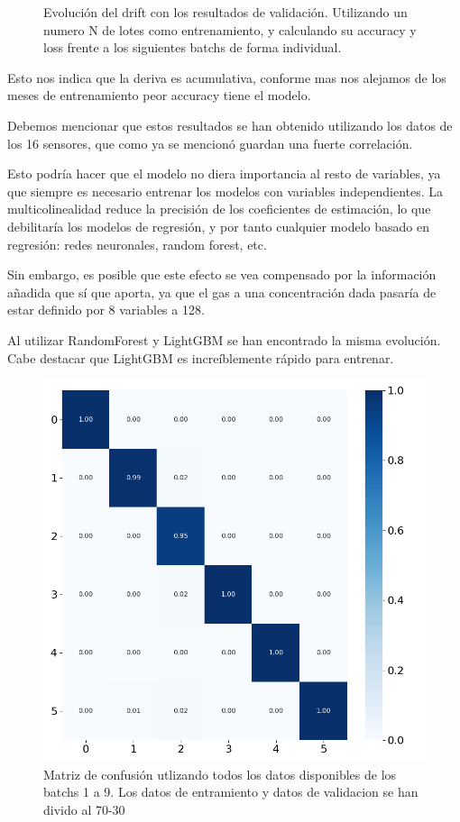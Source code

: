 \begin{figure}
	\caption[Evolución del drift con los resultados de validación]{Evolución del drift con los resultados de validación. Utilizando un numero N de lotes como entrenamiento, y calculando su accuracy y loss frente a los siguientes batchs de forma individual. }
	\label{fig:EvoModelSimpleBatch}
\end{figure}


Esto nos indica que la deriva es acumulativa, conforme mas nos alejamos de los meses de entrenamiento peor accuracy tiene el modelo.


Debemos mencionar que estos resultados se han obtenido utilizando los datos de los 16 sensores, que como ya se mencionó guardan una fuerte correlación. 


Esto podría hacer que el modelo no diera importancia al resto de variables, ya que siempre es necesario entrenar los modelos con variables independientes. La multicolinealidad reduce la precisión de los coeficientes de estimación, lo que debilitaría los modelos de regresión, y por tanto cualquier modelo basado en regresión: redes neuronales, random forest, etc.

Sin embargo, es posible que este efecto se vea compensado por la información añadida que sí que aporta, ya que el gas a una concentración dada pasaría de estar definido por 8 variables a 128.

Al utilizar RandomForest y LightGBM se han encontrado la misma evolución. Cabe destacar que LightGBM es increíblemente rápido para entrenar. 

\begin{figure}
	\centering
	\includegraphics[width=0.6\linewidth]{../py_imgs/Setp4_conf_matrix_batch1to9}
	\caption{Matriz de confusión utlizando todos los datos disponibles de los batchs 1 a 9. Los datos de entramiento y datos de validacion se han divido al 70-30}
	\label{fig:setp4confmatrixbatch1to9}
\end{figure}

